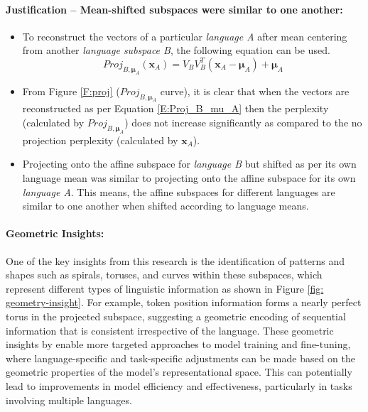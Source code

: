\paragraph{Justification -- Mean-shifted subspaces were similar to one another:}
\begin{itemize}
	\item To reconstruct the vectors of a particular \emph{language A} after mean centering from another \emph{language subspace B}, the following equation can be used.
	\begin{equation}\label{E:Proj_B_mu_A}
		Proj_{B, \bm{\mu}_A}(\mathbf{x}_A) = V_B V_B^T (\mathbf{x}_A - \bm{\mu}_A) + \bm{\mu}_A
	\end{equation}
	
	\item From Figure \ref{F:proj} ($Proj_{B, \bm{\mu}_A}$ curve), it is clear that when the vectors are reconstructed as per Equation \ref{E:Proj_B_mu_A} then the perplexity (calculated by $Proj_{B, \bm{\mu}_A}$) does not increase significantly as compared to the no projection perplexity (calculated by $\mathbf{x}_A$).
	
	\item Projecting onto the affine subspace for \emph{language B} but shifted as per its own language mean was similar to projecting onto the affine subspace for its own \emph{language A}. This means, the affine subspaces for different languages are similar to one another when shifted according to language means.
\end{itemize}

\paragraph{Geometric Insights:} One of the key insights from this research is the identification of patterns and shapes such as spirals, toruses, and curves within these subspaces, which represent different types of linguistic information as shown in Figure \ref{fig: geometry-insight}. For example, token position information forms a nearly perfect torus in the projected subspace, suggesting a geometric encoding of sequential information that is consistent irrespective of the language. These geometric insights by \citet{chang2022geometry} enable more targeted approaches to model training and fine-tuning, where language-specific and task-specific adjustments can be made based on the geometric properties of the model's representational space. This can potentially lead to improvements in model efficiency and effectiveness, particularly in tasks involving multiple languages.

